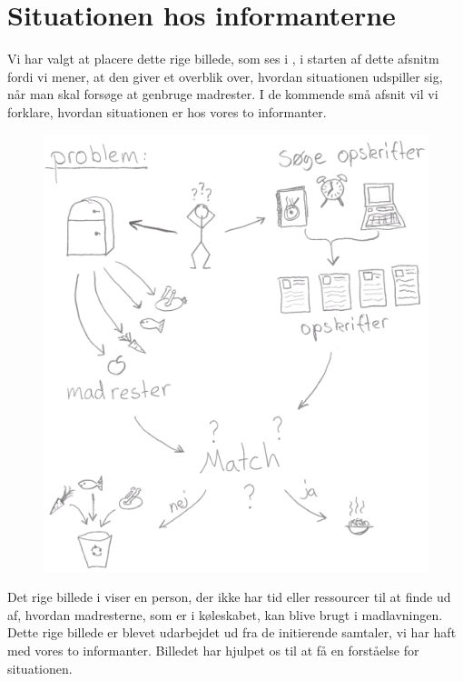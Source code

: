 \section{Situationen hos informanterne}
\label{sec:situation}

Vi har valgt at placere dette rige billede, som ses i , i starten af dette afsnitm fordi vi mener, at den giver et overblik over, hvordan situationen udspiller sig, når man skal forsøge at genbruge madrester. I de kommende små afsnit vil vi forklare, hvordan situationen er hos vores to informanter.

\begin{figure}
\centering
\includegraphics[scale=0.6]{billeder/rigebilleder/problemomraade.png}
\label{fig:rigbillede1}
\end{figure}

Det rige billede i  viser en person, der ikke har tid eller ressourcer til at finde ud af, hvordan madresterne, som er i køleskabet, kan blive brugt i madlavningen. Dette rige billede er blevet udarbejdet ud fra de initierende samtaler, vi har haft med vores to informanter. Billedet har hjulpet os til at få en forståelse for situationen.

